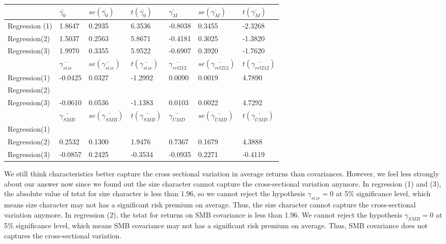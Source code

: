 \documentclass{report}
\begin{document}
\begin{table}[H]
\centering
\begin{tabular}{|l|l|l|l|l|l|l|}
\hline
              & $\bar{\gamma_{0}}$    &  $se(\bar{\gamma_{0}})$   & $t(\bar{\gamma_{0}})$  & $\bar{\gamma_{M}}$     & $se(\bar{\gamma_{M}})$    & $t(\bar{\gamma_{M}})$   \\ \hline
Regression (1) & 1.8647  & 0.2935 & 6.3536  & -0.8038 & 0.3455 & -2.3268 \\ \hline
Regression(2)  & 1.5037  & 0.2563 & 5.8671  & -0.4181 & 0.3025 & -1.3820 \\ \hline
Regression(3)  & 1.9970  & 0.3355 & 5.9522  & -0.6907 & 0.3920 & -1.7620 \\ \hline
               & $\bar{\gamma_{size}}$    &  $se(\bar{\gamma_{size}})$   & $t(\bar{\gamma_{size}})$  & $\bar{\gamma_{ret212}}$     & $se(\bar{\gamma_{ret212}})$    & $t(\bar{\gamma_{ret212}})$   \\ \hline
Regression(1)  & -0.0425 & 0.0327 & -1.2992 & 0.0090  & 0.0019 & 4.7890  \\ \hline
Regression(2)  &         &        &         &         &        &         \\ \hline
Regression(3)  & -0.0610 & 0.0536 & -1.1383 & 0.0103  & 0.0022 & 4.7292  \\ \hline
                & $\bar{\gamma_{SMB}}$    &  $se(\bar{\gamma_{SMB}})$   & $t(\bar{\gamma_{SMB}})$  & $\bar{\gamma_{UMD}}$     & $se(\bar{\gamma_{UMD}})$    & $t(\bar{\gamma_{UMD}})$   \\ \hline
Regression(1)  &         &        &         &         &        &         \\ \hline
Regression(2)  & 0.2532  & 0.1300 & 1.9476  & 0.7367  & 0.1679 & 4.3888  \\ \hline
Regression(3)  & -0.0857 & 0.2425 & -0.3534 & -0.0935 & 0.2271 & -0.4119 \\ \hline
\end{tabular}
\end{table}

We still think characteristics better capture the cross sectional variation in average returns than covariances. However, we feel less strongly about our answer now since we found out the size character cannot capture the cross-sectional variation anymore. In regression (1) and (3), the absolute value of tstat for size character is less than 1.96, so we cannot reject the hypothesis $\gamma_{size} = 0$ at 5\% significance level, which means size character may not has a significant risk premium on average. Thus, the size character cannot capture the cross-sectional variation anymore. In regression (2), the tstat for returns on SMB covariance is less than 1.96. We cannot reject the hypothesis $\gamma_{SMB} = 0$ at 5\% significance level, which means SMB covariance may not has a significant risk premium on average. Thus, SMB covariance does not captures the cross-sectional variation. 
\end{document}
